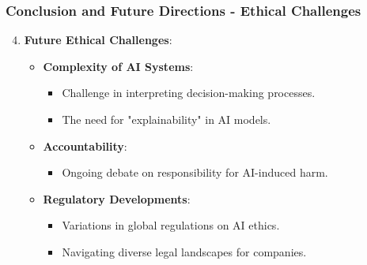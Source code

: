 \documentclass[aspectratio=169]{beamer}
\begin{document}
\begin{frame}[fragile]
  \frametitle{Conclusion and Future Directions - Ethical Challenges}
  
  \begin{enumerate}
      \setcounter{enumi}{3}
      \item \textbf{Future Ethical Challenges}:
      \begin{itemize}
          \item \textbf{Complexity of AI Systems}: 
          \begin{itemize}
              \item Challenge in interpreting decision-making processes.
              \item The need for "explainability" in AI models.
          \end{itemize}
  
          \item \textbf{Accountability}:
          \begin{itemize}
              \item Ongoing debate on responsibility for AI-induced harm.
          \end{itemize}
  
          \item \textbf{Regulatory Developments}:
          \begin{itemize}
              \item Variations in global regulations on AI ethics.
              \item Navigating diverse legal landscapes for companies.
          \end{itemize}
      \end{itemize}
  \end{enumerate}
\end{frame}
\end{document}
